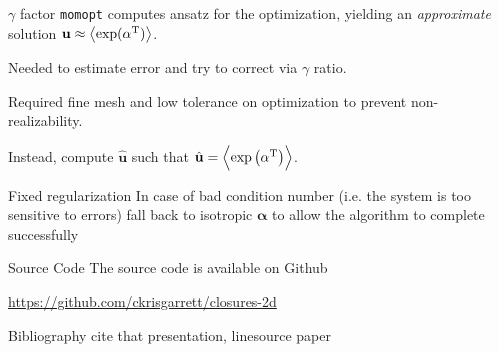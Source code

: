 \documentclass{beamer}
\renewcommand{\vec}[1]{\ensuremath{\mathbf{#1}}}
\newcommand{\integral}[1]{\ensuremath{\left\langle #1 \right\rangle}}
\newcommand{\T}[1]{\ensuremath{#1^\textnormal{T}}}
\newcommand{\momopt}{\texttt{momopt}\xspace}
\begin{document}
    \begin{frame}{$\gamma$ factor}
        \momopt computes ansatz for the optimization, yielding an \emph{approximate} solution $\vec{u} \approx \integral{\exp (\T{\vec{\alpha}})}$.

        Needed to estimate error and try to correct via $\gamma$ ratio.

        Required fine mesh and low tolerance on optimization to prevent non-realizability.

        Instead, compute $\hat{\vec{u}}$ such that $\hat{\vec{u}} = \integral{\exp \left(\T{\vec{\alpha}}\right)}$.
    \end{frame}

    \begin{frame}{Fixed regularization}
        In case of bad condition number (i.e. the system is too sensitive to errors) fall back to isotropic \vec{\alpha} to allow the algorithm to complete successfully
    \end{frame}

    \begin{frame}{Source Code}
        The source code is available on Github

        \url{https://github.com/ckrisgarrett/closures-2d}
    \end{frame}

    \begin{frame}{Bibliography}
        cite that presentation, linesource paper
    \end{frame}
\end{document}
